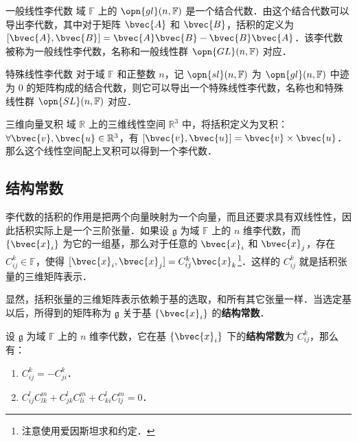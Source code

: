 \begin{example}{一般线性李代数}
域 $\mathbb{F}$ 上的 $\opn{gl}(n, \mathbb{F})$ 是一个结合代数．由这个结合代数可以导出李代数，其中对于矩阵 $\bvec{A}$ 和 $\bvec{B}$，括积的定义为 $[\bvec{A}, \bvec{B}]=\bvec{A}\bvec{B}-\bvec{B}\bvec{A}$．该李代数被称为一般线性李代数，名称和一般线性群 $\opn{GL}(n, \mathbb{F})$ 对应．%
\end{example}

\begin{example}{特殊线性李代数}
对于域 $\mathbb{F}$ 和正整数 $n$，记 $\opn{sl}(n, \mathbb{F})$ 为 $\opn{gl}(n, \mathbb{F})$ 中迹为 $0$ 的矩阵构成的结合代数，则它可以导出一个特殊线性李代数，名称也和特殊线性群 $\opn{SL}(n, \mathbb{F})$ 对应．
\end{example}

\begin{example}{三维向量叉积}\label{LieAlg_ex1}
域 $\mathbb{R}$ 上的三维线性空间 $\mathbb{R}^3$ 中，将括积定义为叉积：$\forall \bvec{v}, \bvec{u}\in \mathbb{R}^3$，有 $[\bvec{v}, \bvec{u}]=\bvec{v}\times\bvec{u}$．那么这个线性空间配上叉积可以得到一个李代数．
\end{example}

\subsection{结构常数}

李代数的括积的作用是把两个向量映射为一个向量，而且还要求具有双线性性，因此括积实际上是一个三阶张量．如果设 $\mathfrak{g}$ 为域 $\mathbb{F}$ 上的 $n$ 维李代数，而 $\{\bvec{x}_i\}$ 为它的一组基，那么对于任意的 $\bvec{x}_i$ 和 $\bvec{x}_j$，存在 $C^k_{ij}\in\mathbb{F}$，使得 $[\bvec{x}_i, \bvec{x}_j]=C^k_{ij}\bvec{x}_k$\footnote{注意使用爱因斯坦求和约定．}．这样的 $C^k_{ij}$ 就是括积张量的三维矩阵表示．

显然，括积张量的三维矩阵表示依赖于基的选取，和所有其它张量一样．当选定基以后，所得到的矩阵称为 $\mathfrak{g}$ 关于基 $\{\bvec{x}_i\}$ 的\textbf{结构常数}．

\begin{theorem}{}\label{LieAlg_the1}
设 $\mathfrak{g}$ 为域 $\mathbb{F}$ 上的 $n$ 维李代数，它在基 $\{\bvec{x}_i\}$ 下的\textbf{结构常数}为 $C^k_{ij}$，那么有：
\begin{enumerate}
\item $C^k_{ij}=-C^k_{ji}$．
\item $C^l_{ij}C^m_{lk}+C^l_{jk}C^m_{li}+C^l_{ki}C^m_{lj}=0$．
\end{enumerate}
\end{theorem}

